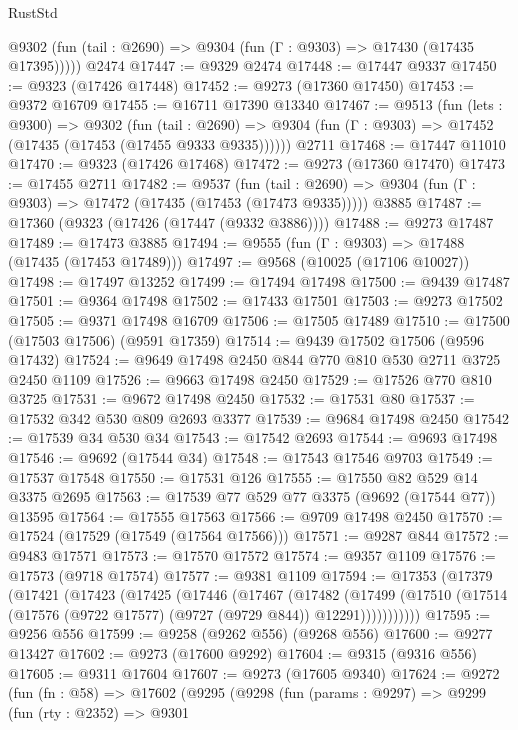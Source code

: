 \begin{lexlean}{RustStd}
\begin{coremodule}
      @9302 (fun (tail : @2690) => @9304 (fun (Γ : @9303) => @17430 (@17435 @17395)))))
    @2474
@17447 := @9329 @2474
@17448 := @17447 @9337
@17450 := @9323 (@17426 @17448)
@17452 := @9273 (@17360 @17450)
@17453 := @9372 @16709
@17455 := @16711 @17390 @13340
@17467 := @9513
    (fun (lets : @9300) =>
    @9302
      (fun (tail : @2690) =>
      @9304 (fun (Γ : @9303) => @17452 (@17435 (@17453 (@17455 @9333 @9335))))))
    @2711
@17468 := @17447 @11010
@17470 := @9323 (@17426 @17468)
@17472 := @9273 (@17360 @17470)
@17473 := @17455 @2711
@17482 := @9537
    (fun (tail : @2690) => @9304 (fun (Γ : @9303) => @17472 (@17435 (@17453 (@17473 @9335)))))
    @3885
@17487 := @17360 (@9323 (@17426 (@17447 (@9332 @3886))))
@17488 := @9273 @17487
@17489 := @17473 @3885
@17494 := @9555 (fun (Γ : @9303) => @17488 (@17435 (@17453 @17489)))
@17497 := @9568 (@10025 (@17106 @10027))
@17498 := @17497 @13252
@17499 := @17494 @17498
@17500 := @9439 @17487
@17501 := @9364 @17498
@17502 := @17433 @17501
@17503 := @9273 @17502
@17505 := @9371 @17498 @16709
@17506 := @17505 @17489
@17510 := @17500 (@17503 @17506) (@9591 @17359)
@17514 := @9439 @17502 @17506 (@9596 @17432)
@17524 := @9649 @17498 @2450 @844 @770 @810 @530 @2711 @3725 @2450 @1109
@17526 := @9663 @17498 @2450
@17529 := @17526 @770 @810 @3725
@17531 := @9672 @17498 @2450
@17532 := @17531 @80
@17537 := @17532 @342 @530 @809 @2693 @3377
@17539 := @9684 @17498 @2450
@17542 := @17539 @34 @530 @34
@17543 := @17542 @2693
@17544 := @9693 @17498
@17546 := @9692 (@17544 @34)
@17548 := @17543 @17546 @9703
@17549 := @17537 @17548
@17550 := @17531 @126
@17555 := @17550 @82 @529 @14 @3375 @2695
@17563 := @17539 @77 @529 @77 @3375 (@9692 (@17544 @77)) @13595
@17564 := @17555 @17563
@17566 := @9709 @17498 @2450
@17570 := @17524 (@17529 (@17549 (@17564 @17566)))
@17571 := @9287 @844
@17572 := @9483 @17571
@17573 := @17570 @17572
@17574 := @9357 @1109
@17576 := @17573 (@9718 @17574)
@17577 := @9381 @1109
@17594 := @17353
    (@17379
      (@17421
        (@17423
          (@17425
            (@17446
              (@17467
                (@17482
                  (@17499
                    (@17510 (@17514 (@17576 (@9722 @17577) (@9727 (@9729 @844)) @12291)))))))))))
@17595 := @9256 @556
@17599 := @9258 (@9262 @556) (@9268 @556)
@17600 := @9277 @13427
@17602 := @9273 (@17600 @9292)
@17604 := @9315 (@9316 @556)
@17605 := @9311 @17604
@17607 := @9273 (@17605 @9340)
@17624 := @9272
    (fun (fn : @58) =>
    @17602
      (@9295
        (@9298
          (fun (params : @9297) =>
          @9299
            (fun (rty : @2352) =>
            @9301

\end{coremodule}
\end{lexlean}
